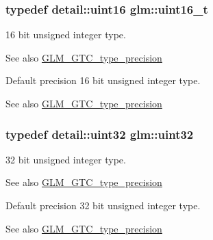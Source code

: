 \subsubsection[{uint16\+\_\+t}]{\setlength{\rightskip}{0pt plus 5cm}typedef {\bf detail\+::uint16} {\bf glm\+::uint16\+\_\+t}}\label{group__gtc__type__precision_gac4eb4f43cae8129b00086dc234d3b8fc}
16 bit unsigned integer type. \begin{DoxySeeAlso}{See also}
\hyperlink{group__gtc__type__precision}{G\+L\+M\+\_\+\+G\+T\+C\+\_\+type\+\_\+precision}
\end{DoxySeeAlso}
Default precision 16 bit unsigned integer type. \begin{DoxySeeAlso}{See also}
\hyperlink{group__gtc__type__precision}{G\+L\+M\+\_\+\+G\+T\+C\+\_\+type\+\_\+precision} 
\end{DoxySeeAlso}
\hypertarget{group__gtc__type__precision_ga202b6a53c105fcb7e531f9b443518451}{}
\subsubsection[{uint32}]{\setlength{\rightskip}{0pt plus 5cm}typedef detail\+::uint32 {\bf glm\+::uint32}}\label{group__gtc__type__precision_ga202b6a53c105fcb7e531f9b443518451}
32 bit unsigned integer type. \begin{DoxySeeAlso}{See also}
\hyperlink{group__gtc__type__precision}{G\+L\+M\+\_\+\+G\+T\+C\+\_\+type\+\_\+precision}
\end{DoxySeeAlso}
Default precision 32 bit unsigned integer type. \begin{DoxySeeAlso}{See also}
\hyperlink{group__gtc__type__precision}{G\+L\+M\+\_\+\+G\+T\+C\+\_\+type\+\_\+precision} 
\end{DoxySeeAlso}
\hypertarget{group__gtc__type__precision_ga822ca53a9ad412504532838906276a99}{}
